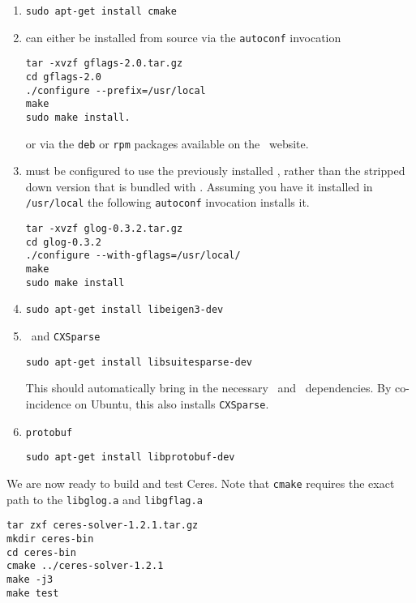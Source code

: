 \begin{enumerate}
\item{\cmake}
\begin{verbatim}
sudo apt-get install cmake
\end{verbatim}

\item{\gflags} can either be installed from source via the \texttt{autoconf} invocation
\begin{verbatim}
tar -xvzf gflags-2.0.tar.gz
cd gflags-2.0
./configure --prefix=/usr/local
make
sudo make install.
\end{verbatim}
or via the \texttt{deb} or \texttt{rpm} packages available on the \gflags\ website.

\item{\glog} must be configured to use the previously installed
\gflags, rather than the stripped down version that is bundled with \glog. Assuming you have it installed in \texttt{/usr/local} the following \texttt{autoconf} invocation installs it.
\begin{verbatim}
tar -xvzf glog-0.3.2.tar.gz
cd glog-0.3.2
./configure --with-gflags=/usr/local/
make
sudo make install
\end{verbatim}

\item{\eigen}
\begin{verbatim}
sudo apt-get install libeigen3-dev
\end{verbatim}

\item{\suitesparse\ and \texttt{CXSparse}}
\begin{verbatim}
sudo apt-get install libsuitesparse-dev
\end{verbatim}
This should automatically bring in the necessary \blas\ and \lapack\ dependencies. By co-incidence on Ubuntu, this also installs \texttt{CXSparse}.

\item{\texttt{protobuf}}
\begin{verbatim}
sudo apt-get install libprotobuf-dev
\end{verbatim}
\end{enumerate}


We are now ready to build and test Ceres. Note that \texttt{cmake} requires the exact path to the \texttt{libglog.a} and \texttt{libgflag.a}

\begin{verbatim}
tar zxf ceres-solver-1.2.1.tar.gz
mkdir ceres-bin
cd ceres-bin
cmake ../ceres-solver-1.2.1
make -j3
make test
\end{verbatim}

